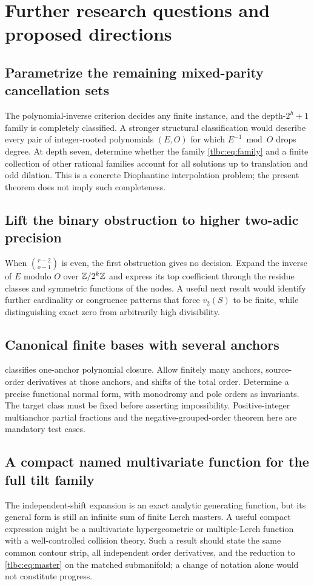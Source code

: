 \documentclass[11pt,letterpaper]{article}
\numberwithin{equation}{section}
\theoremstyle{definition}\newtheorem{definition}[theorem]{Definition}
\theoremstyle{remark}\newtheorem{remark}[theorem]{Remark}
\begin{document}
\section{Further research questions and proposed directions}
\label{tlbc:sec:future}
\subsection{Parametrize the remaining mixed-parity cancellation sets}
The polynomial-inverse criterion decides any finite instance, and the depth-$2^h+1$ family is completely classified. A stronger structural classification would describe every pair of integer-rooted polynomials $(E,O)$ for which $E^{-1}\bmod O$ drops degree. At depth seven, determine whether the family \eqref{tlbc:eq:family} and a finite collection of other rational families account for all solutions up to translation and odd dilation. This is a concrete Diophantine interpolation problem; the present theorem does not imply such completeness.

\subsection{Lift the binary obstruction to higher two-adic precision}
When $\binom{r-2}{o-1}$ is even, the first obstruction gives no decision. Expand the inverse of $E$ modulo $O$ over $\mathbb Z/2^k\mathbb Z$ and express its top coefficient through the residue classes and symmetric functions of the nodes. A useful next result would identify further cardinality or congruence patterns that force $v_2(S)$ to be finite, while distinguishing exact zero from arbitrarily high divisibility.

\subsection{Canonical finite bases with several anchors}
 classifies one-anchor polynomial closure. Allow finitely many anchors, source-order derivatives at those anchors, and shifts of the total order. Determine a precise functional normal form, with monodromy and pole orders as invariants. The target class must be fixed before asserting impossibility. Positive-integer multianchor partial fractions and the negative-grouped-order theorem here are mandatory test cases.

\subsection{A compact named multivariate function for the full tilt family}
The independent-shift expansion is an exact analytic generating function, but its general form is still an infinite sum of finite Lerch masters. A useful compact expression might be a multivariate hypergeometric or multiple-Lerch function with a well-controlled collision theory. Such a result should state the same common contour strip, all independent order derivatives, and the reduction to \eqref{tlbc:eq:master} on the matched submanifold; a change of notation alone would not constitute progress.
\end{document}
